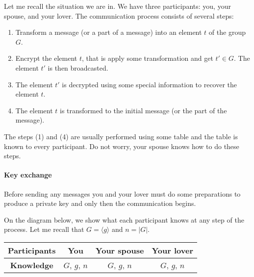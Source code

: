 Let me recall the situation we are in. We have three participants: you, your spouse, and your lover. The communication process consists of several steps:
\begin{enumerate}
\item Transform a message (or a part of a message) into an element $t$ of the group $G$.

\item Encrypt the element $t$, that is apply some transformation and get $t'\in G$. The element $t'$ is then broadcasted.

\item The element $t'$ is decrypted using some special information to recover the element $t$.

\item The element $t$ is transformed to the initial message (or the part of the message).
\end{enumerate}
The steps (1) and (4) are usually performed using some table and the table is known to every participant. Do not worry, your spouse knows how to do these steps.



\paragraph{Key exchange}
Before sending any messages you and your lover must do some preparations to produce a private key and only then the communication begins. 

On the diagram below, we show what each participant knows at any step of the process. Let me recall that $G = \langle g\rangle$ and $n = |G|$.
\begin{center}
\begin{tabular}{|c|c|c|c|}
\hline
{\bf Participants}&{You}&{Your spouse}&{Your lover}\\
\hline
{\bf Knowledge}&{\textcolor{OliveGreen}{$G$}, \textcolor{OliveGreen}{$g$}, \textcolor{OliveGreen}{$n$}}&{\textcolor{OliveGreen}{$G$}, \textcolor{OliveGreen}{$g$}, \textcolor{OliveGreen}{$n$}}&{\textcolor{OliveGreen}{$G$}, \textcolor{OliveGreen}{$g$}, \textcolor{OliveGreen}{$n$}}\\
\hline
\end{tabular}
\end{center}

